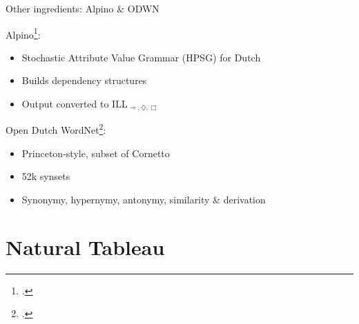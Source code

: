 \documentclass[aspectratio=169,handout]{beamer}
\newcommand{\li}{\!\multimap\!}
\begin{document}
\begin{frame}{Other ingredients: Alpino \& ODWN}

Alpino\footcite{alpino}:
\begin{itemize}
    \item Stochastic Attribute Value Grammar (HPSG) for Dutch
    \item Builds dependency structures
    \item Output converted to ILL$_{\li,\diamondsuit,\Box}$
\end{itemize}
\vfill

Open Dutch WordNet\footcite{ODWN:2016}:%
\begin{itemize}
    \item Princeton-style, subset of Cornetto
    \item 52k synsets
    \item Synonymy, hypernymy, antonymy, similarity \& derivation
\end{itemize}


\end{frame}


\section{Natural Tableau}
\end{document}
